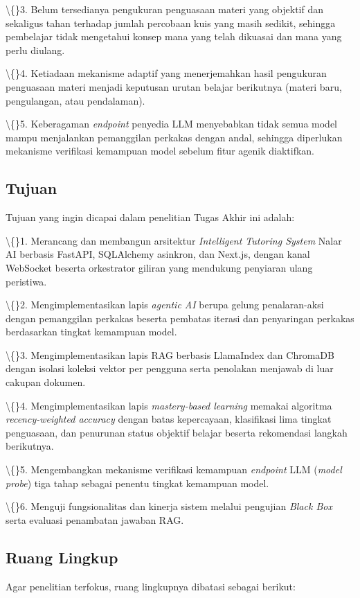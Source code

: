 \documentclass[12pt,a4paper]{article}
\begin{document}
\textbackslash\{\}3. Belum tersedianya pengukuran penguasaan materi yang objektif dan sekaligus tahan terhadap jumlah percobaan kuis yang masih sedikit, sehingga pembelajar tidak mengetahui konsep mana yang telah dikuasai dan mana yang perlu diulang.

\textbackslash\{\}4. Ketiadaan mekanisme adaptif yang menerjemahkan hasil pengukuran penguasaan materi menjadi keputusan urutan belajar berikutnya (materi baru, pengulangan, atau pendalaman).

\textbackslash\{\}5. Keberagaman \textit{endpoint} penyedia LLM menyebabkan tidak semua model mampu menjalankan pemanggilan perkakas dengan andal, sehingga diperlukan mekanisme verifikasi kemampuan model sebelum fitur agenik diaktifkan.

\subsection*{Tujuan}
Tujuan yang ingin dicapai dalam penelitian Tugas Akhir ini adalah:

\textbackslash\{\}1. Merancang dan membangun arsitektur \textit{Intelligent Tutoring System} Nalar AI berbasis FastAPI, SQLAlchemy asinkron, dan Next.js, dengan kanal WebSocket beserta orkestrator giliran yang mendukung penyiaran ulang peristiwa.

\textbackslash\{\}2. Mengimplementasikan lapis \textit{agentic AI} berupa gelung penalaran-aksi dengan pemanggilan perkakas beserta pembatas iterasi dan penyaringan perkakas berdasarkan tingkat kemampuan model.

\textbackslash\{\}3. Mengimplementasikan lapis RAG berbasis LlamaIndex dan ChromaDB dengan isolasi koleksi vektor per pengguna serta penolakan menjawab di luar cakupan dokumen.

\textbackslash\{\}4. Mengimplementasikan lapis \textit{mastery-based learning} memakai algoritma \textit{recency-weighted accuracy} dengan batas kepercayaan, klasifikasi lima tingkat penguasaan, dan penurunan status objektif belajar beserta rekomendasi langkah berikutnya.

\textbackslash\{\}5. Mengembangkan mekanisme verifikasi kemampuan \textit{endpoint} LLM (\textit{model probe}) tiga tahap sebagai penentu tingkat kemampuan model.

\textbackslash\{\}6. Menguji fungsionalitas dan kinerja sistem melalui pengujian \textit{Black Box} serta evaluasi penambatan jawaban RAG.

\subsection*{Ruang Lingkup}
Agar penelitian terfokus, ruang lingkupnya dibatasi sebagai berikut:
\end{document}
